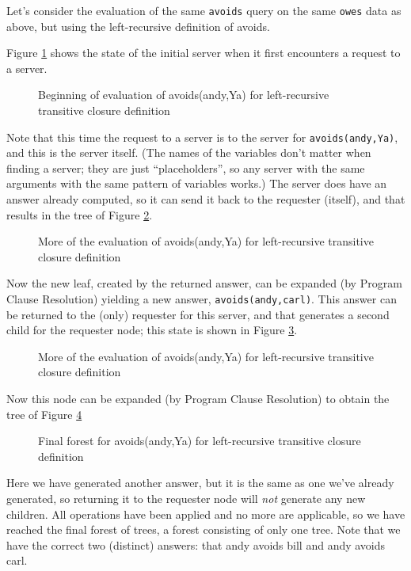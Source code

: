 Let's consider the evaluation of the same \verb|avoids| query on the
same \verb|owes| data as above, but using the left-recursive
definition of avoids.

Figure \ref{slgf-owel1} shows the state of the initial server when it
first encounters a request to a server.
\begin{figure}
\centerline{}
\caption{Beginning of evaluation of avoids(andy,Ya) for left-recursive
transitive closure definition}\label{slgf-owel1}
\end{figure}
Note that this time the request to a server is to the server for
\verb|avoids(andy,Ya)|, and this is the server itself.  (The names of
the variables don't matter when finding a server; they are just
``placeholders'', so any server with the same arguments with the same
pattern of variables works.)  The server does have an answer already
computed, so it can send it back to the requester (itself), and that
results in the tree of Figure \ref{slgf-owel2}.
\begin{figure}
\centerline{}
\caption{More of the evaluation of avoids(andy,Ya) for left-recursive
transitive closure definition}\label{slgf-owel2}
\end{figure}
Now the new leaf, created by the returned answer, can be expanded (by
{\sc Program Clause Resolution}) yielding a new answer,
\verb|avoids(andy,carl)|.  This answer can be returned to the (only)
requester for this server, and that generates a second child for the
requester node; this state is shown in Figure \ref{slgf-owel3}.
\begin{figure}
\centerline{}
\caption{More of the evaluation of avoids(andy,Ya) for left-recursive
transitive closure definition}\label{slgf-owel3}
\end{figure}

Now this node can be expanded (by {\sf Program Clause Resolution}) to
obtain the tree of Figure \ref{slgf-owel4}
\begin{figure}
\centerline{}
\caption{Final forest for avoids(andy,Ya) for left-recursive
transitive closure definition}\label{slgf-owel4}
\end{figure}
Here we have generated another answer, but it is the same as one we've
already generated, so returning it to the requester node will {\em
not} generate any new children.  All operations have been applied and
no more are applicable, so we have reached the final forest of trees,
a forest consisting of only one tree.  Note that we have the correct
two (distinct) answers: that andy avoids bill and andy avoids carl.

